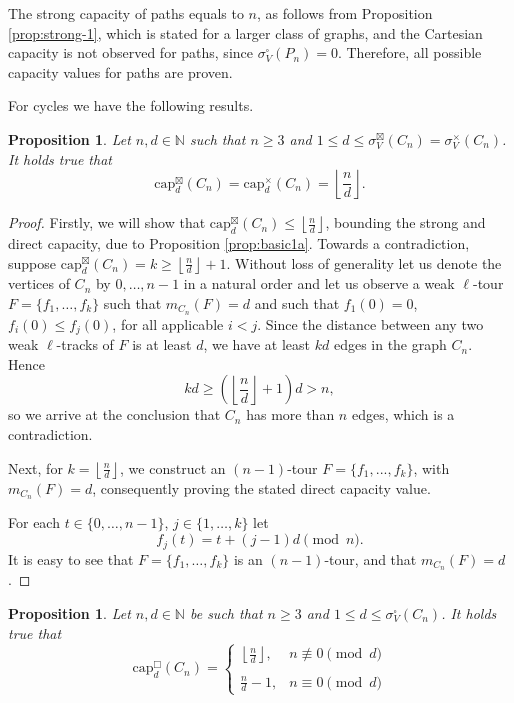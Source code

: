 \documentclass{article}
\newtheorem{proposition}[theorem]{Proposition}
\newcommand{\dcap}[2]{\mathrm{cap}^{\times}_{#1}(#2)}
\newcommand{\scap}[2]{\mathrm{cap}^{\boxtimes}_{#1}(#2)}
\newcommand{\ccap}[2]{\mathrm{cap}^{\mathbin{\Box}}_{#1}(#2)}
\begin{document}
 The strong capacity of paths equals to $n$, as follows from Proposition \ref{prop:strong-1}, which is stated for a larger class of graphs, and the Cartesian capacity is not observed for paths, since $\sigma^\square_V(P_n)=0$. Therefore, all possible capacity values for paths are proven.


For cycles we have the following results.


\begin{proposition}\label{prop:cyc_sd}  Let $n,d\in\mathbb{N}$ such that $n\geq 3$ and $1\leq d\leq \sigma^\boxtimes_V(C_n)=\sigma^\times_V(C_n)$. 
    It holds true that 
    $$\scap{d}{C_n}= \dcap{d}{C_n}=\left\lfloor\frac{n}{d}\right\rfloor.$$
    
\end{proposition}
\begin{proof} Firstly, we will show that $\scap{d}{C_n} \leq\left\lfloor\frac{n}{d}\right\rfloor$, bounding the strong and direct capacity, due to Proposition \ref{prop:basic1a}. 
    Towards a contradiction, suppose $\scap{d}{C_n}=k \geq \left\lfloor\frac{n}{d}\right\rfloor+1$. Without loss of generality let us denote the vertices of $C_n$ by $0,\ldots,n-1$ in a natural order and let us observe a weak $\ell$-tour $F=\{f_1,\ldots,f_k\}$ such that  $m_{C_n}(F)=d$ and such that $f_1(0)=0$, $f_i(0)\leq f_j(0)$, for all applicable $i<j$. Since the distance between any two weak $\ell$-tracks of $F$ is at least $d$, we have at least $kd$ edges in the graph $C_n$. Hence
    $$kd \geq \left(\left\lfloor\frac{n}{d}\right\rfloor+1\right) d >n,$$ so we arrive at the conclusion that $C_n$ has more than $n$ edges, which is a contradiction.
    
    Next, for $k=\left\lfloor\frac{n}{d}\right\rfloor$, we construct an $(n-1)$-tour $F=\{f_1,...,f_k\}$, with $m_{C_n}(F)=d$, consequently proving
    the stated direct capacity value.
    
    For each $t\in\{0,\ldots,n-1\}$, $j\in\{1,\ldots,k\}$ let
    $$f_j(t)=t+(j-1)d \pmod n.$$
      It is easy to see that $F=\{f_1,\ldots,f_k\}$ is an $(n-1)$-tour, and that $m_{C_n}(F)= d$.
\end{proof}

\begin{proposition}\label{prop:cyc_c}  Let $n,d\in\mathbb{N}$ be such that $n\geq 3$ and $1\leq d\leq \sigma^\square_V(C_n)$. 
    It holds true that 
    $$\ccap{d}{C_n} =\left\{
	\begin{array}{ll}
		\left\lfloor\frac{n}{d}\right\rfloor,  & n \not\equiv 0 \pmod d \\
        \\
		\frac{n}{d} -1, & n \equiv 0 \pmod d 
	\end{array}
\right.$$
    
\end{proposition}
\end{document}
